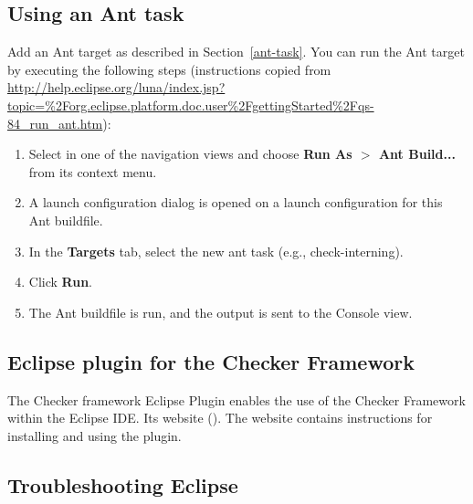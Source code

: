 \subsection{Using an Ant task\label{eclipse-ant}}

Add an Ant target as described in Section~\ref{ant-task}.  You can
run the Ant target by executing the following steps
(instructions copied from {\codesize\url{http://help.eclipse.org/luna/index.jsp?topic=%2Forg.eclipse.platform.doc.user%2FgettingStarted%2Fqs-84_run_ant.htm}}):

\begin{enumerate}

\item
  Select  in one of the navigation views and choose
  {\bf Run As $>$ Ant Build...} from its context menu.

\item
  A launch configuration dialog is opened on a launch configuration
  for this Ant buildfile.

\item
  In the {\bf Targets} tab, select the new ant task (e.g., check-interning).

\item
  Click {\bf Run}.

\item
  The Ant buildfile is run, and the output is sent to the Console view.

\end{enumerate}


\label{eclipse-plug-in}         %
\subsection{Eclipse plugin for the Checker Framework\label{eclipse-plugin}}

The Checker framework Eclipse Plugin enables the use of the Checker
Framework within the Eclipse IDE\@.
Its website ().
The website contains instructions for installing and using the plugin.


\subsection{Troubleshooting Eclipse\label{eclipse-troubleshooting}}

